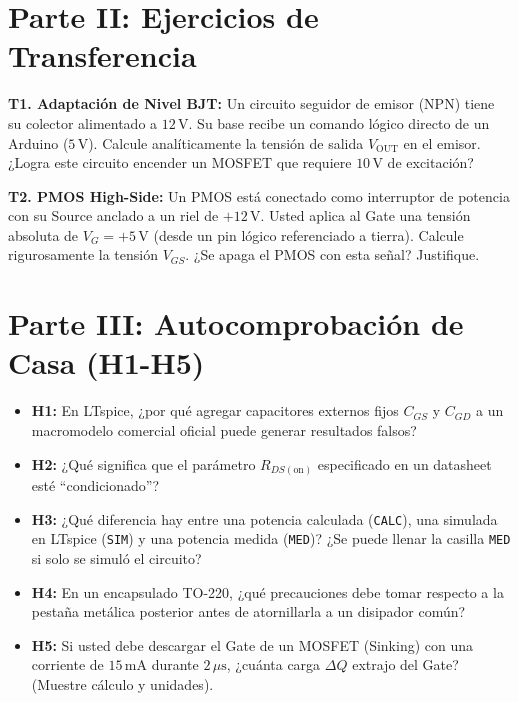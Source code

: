 \documentclass[11pt, a4paper]{article}
\begin{document}
\section*{Parte II: Ejercicios de Transferencia}

\textbf{T1. Adaptación de Nivel BJT:} Un circuito seguidor de emisor (NPN) tiene su colector alimentado a $12\,\text{V}$. Su base recibe un comando lógico directo de un Arduino ($5\,\text{V}$). Calcule analíticamente la tensión de salida $V_{\text{OUT}}$ en el emisor. ¿Logra este circuito encender un MOSFET que requiere $10\,\text{V}$ de excitación?
\vspace{3cm}

\textbf{T2. PMOS High-Side:} Un PMOS está conectado como interruptor de potencia con su Source anclado a un riel de $+12\,\text{V}$. Usted aplica al Gate una tensión absoluta de $V_G = +5\,\text{V}$ (desde un pin lógico referenciado a tierra). Calcule rigurosamente la tensión $V_{GS}$. ¿Se apaga el PMOS con esta señal? Justifique.
\vspace{3cm}

\section*{Parte III: Autocomprobación de Casa (H1-H5)}
\begin{itemize}
    \setlength\itemsep{0.5em}
    \item \textbf{H1:} En LTspice, ¿por qué agregar capacitores externos fijos $C_{GS}$ y $C_{GD}$ a un macromodelo comercial oficial puede generar resultados falsos?
    \item \textbf{H2:} ¿Qué significa que el parámetro $R_{DS(\text{on})}$ especificado en un datasheet esté ``condicionado''?
    \item \textbf{H3:} ¿Qué diferencia hay entre una potencia calculada (\texttt{CALC}), una simulada en LTspice (\texttt{SIM}) y una potencia medida (\texttt{MED})? ¿Se puede llenar la casilla \texttt{MED} si solo se simuló el circuito?
    \item \textbf{H4:} En un encapsulado TO-220, ¿qué precauciones debe tomar respecto a la pestaña metálica posterior antes de atornillarla a un disipador común?
    \item \textbf{H5:} Si usted debe descargar el Gate de un MOSFET (Sinking) con una corriente de $15\,\text{mA}$ durante $2\,\mu\text{s}$, ¿cuánta carga $\Delta Q$ extrajo del Gate? (Muestre cálculo y unidades).
\end{itemize}
\end{document}
